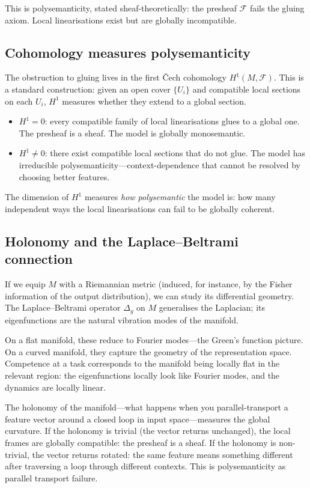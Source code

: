 \documentclass[11pt,a4paper]{article}
\begin{document}
This is polysemanticity, stated sheaf-theoretically: the presheaf
$\mathcal{F}$ fails the gluing axiom. Local linearisations exist but are
globally incompatible.

\subsection{Cohomology measures polysemanticity}

The obstruction to gluing lives in the first \v{C}ech cohomology
$H^1(M, \mathcal{F})$. This is a standard construction: given an open cover
$\{U_i\}$ and compatible local sections on each $U_i$, $H^1$ measures
whether they extend to a global section.

\begin{itemize}[leftmargin=*]
  \item $H^1 = 0$: every compatible family of local linearisations glues to a
    global one. The presheaf is a sheaf. The model is globally monosemantic.
  \item $H^1 \neq 0$: there exist compatible local sections that do not glue.
    The model has irreducible polysemanticity---context-dependence that cannot
    be resolved by choosing better features.
\end{itemize}

The dimension of $H^1$ measures \emph{how polysemantic} the model is: how
many independent ways the local linearisations can fail to be globally coherent.

\subsection{Holonomy and the Laplace--Beltrami connection}

If we equip $M$ with a Riemannian metric (induced, for instance, by the Fisher
information of the output distribution), we can study its differential geometry.
The Laplace--Beltrami operator $\Delta_g$ on $M$ generalises the Laplacian; its
eigenfunctions are the natural vibration modes of the manifold.

On a flat manifold, these reduce to Fourier modes---the Green's function
picture. On a curved manifold, they capture the geometry of the representation
space. Competence at a task corresponds to the manifold being locally flat in
the relevant region: the eigenfunctions locally look like Fourier modes, and
the dynamics are locally linear.

The holonomy of the manifold---what happens when you parallel-transport a
feature vector around a closed loop in input space---measures the global
curvature. If the holonomy is trivial (the vector returns unchanged), the local
frames are globally compatible: the presheaf is a sheaf. If the holonomy is
non-trivial, the vector returns rotated: the same feature means something
different after traversing a loop through different contexts. This is
polysemanticity as parallel transport failure.
\end{document}
